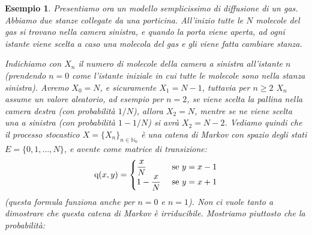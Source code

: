 \documentclass[11pt]{book}
\theoremstyle{Definizione}
\theoremstyle{TeoremaProposizioneLemmaCorollario}
\theoremstyle{OsservazioneNota}
\newtheorem{myes}{Esempio}[section]
\newcommand{\N}{\mathbb{N}}
\newcommand{\q}{\textup{q}}
\begin{document}
\begin{myes}
Presentiamo ora un modello semplicissimo di diffusione di un gas. Abbiamo due stanze collegate da una porticina. All'inizio tutte le $N$ molecole del gas si trovano nella camera sinistra, e quando la porta viene aperta, ad ogni istante viene scelta a caso una molecola del gas e gli viene fatta cambiare stanza.
\begin{center}
\end{center}
Indichiamo con $X_n$ il numero di molecole della camera a sinistra all'istante $n$ (prendendo $n = 0$ come l'istante iniziale in cui tutte le molecole sono nella stanza sinistra). Avremo $X_0= N$, e sicuramente $X_1 = N-1$, tuttavia per $n\geq 2$ $X_n$ assume un valore aleatorio, ad esempio per $n = 2$, se viene scelta la pallina nella camera destra (con probabilità $1/N$), allora $X_2 = N$, mentre se ne viene scelta una a sinistra (con probabilità $1-1/N$) si avrà $X_2 = N-2$. Vediamo quindi che il processo stocastico $X = \{X_n\}_{n \in \N_0}$ è una catena di Markov con spazio degli stati $E = \{0,1,\dots,N\}$, e avente come matrice di transizione:
$$
\q(x,y) = \begin{cases}
\displaystyle{\frac{x}{N}}&\textup{ se }y = x-1\\
\displaystyle{1-\frac{x}{N}}&\textup{ se }y = x+1
\end{cases}
$$
(questa formula funziona anche per $n = 0$ e $n = 1$). Non ci vuole tanto a dimostrare che questa catena di Markov è irriducibile. Mostriamo piuttosto che la probabilità:

\end{myes}
\end{document}
